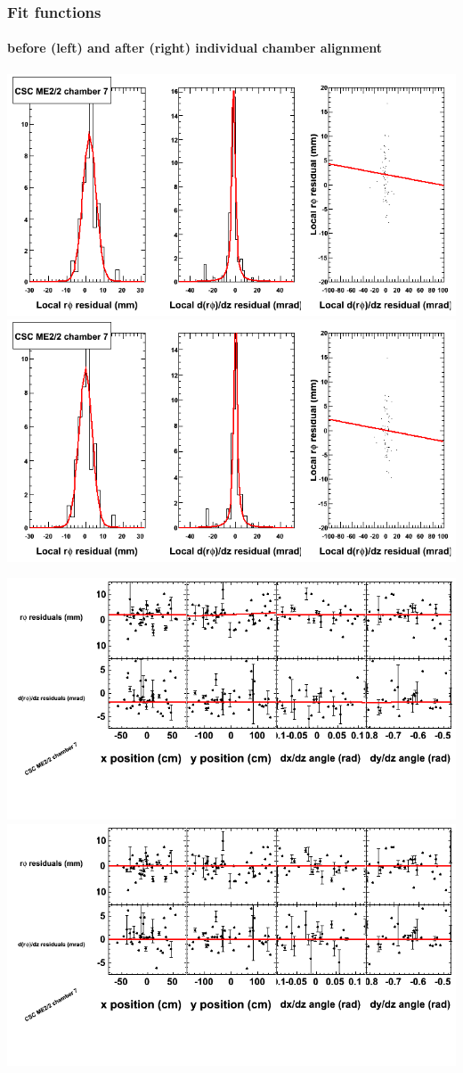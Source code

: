 \documentclass[compress]{beamer}
\begin{document}
\begin{frame}
\frametitle{Fit functions}
\framesubtitle{before (left) and after (right) individual chamber alignment}
\includegraphics[width=0.5\linewidth]{ringfits_3dof/beforefit_MEp22_07_bellcurve.png} \includegraphics[width=0.5\linewidth]{ringfits_3dof/afterfit_MEp22_07_bellcurve.png}

\includegraphics[width=0.5\linewidth]{ringfits_3dof/beforefit_MEp22_07_polynomials.png} \includegraphics[width=0.5\linewidth]{ringfits_3dof/afterfit_MEp22_07_polynomials.png}
\end{frame}
\end{document}
